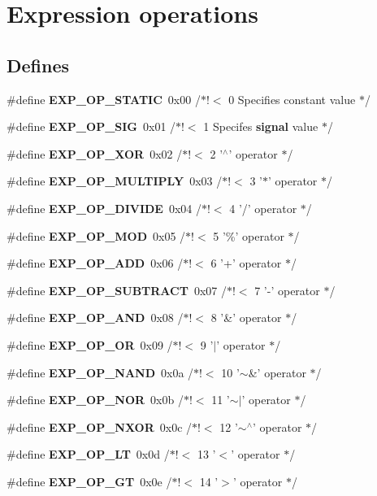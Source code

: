 \section{Expression operations}
\label{group__expr__ops}
\subsection*{Defines}
\begin{CompactItemize}
\item 
\#define {\bf EXP\_\-OP\_\-STATIC}\ 0x00  /$\ast$!$<$  0 Specifies constant value      $\ast$/
\item 
\#define {\bf EXP\_\-OP\_\-SIG}\ 0x01  /$\ast$!$<$  1 Specifes {\bf signal} value         $\ast$/
\item 
\#define {\bf EXP\_\-OP\_\-XOR}\ 0x02  /$\ast$!$<$  2 '$^\wedge$'   operator                $\ast$/
\item 
\#define {\bf EXP\_\-OP\_\-MULTIPLY}\ 0x03  /$\ast$!$<$  3 '$\ast$'   operator                $\ast$/
\item 
\#define {\bf EXP\_\-OP\_\-DIVIDE}\ 0x04  /$\ast$!$<$  4 '/'   operator                $\ast$/
\item 
\#define {\bf EXP\_\-OP\_\-MOD}\ 0x05  /$\ast$!$<$  5 '\%'   operator                $\ast$/
\item 
\#define {\bf EXP\_\-OP\_\-ADD}\ 0x06  /$\ast$!$<$  6 '+'   operator                $\ast$/
\item 
\#define {\bf EXP\_\-OP\_\-SUBTRACT}\ 0x07  /$\ast$!$<$  7 '-'   operator                $\ast$/
\item 
\#define {\bf EXP\_\-OP\_\-AND}\ 0x08  /$\ast$!$<$  8 '\&'   operator                $\ast$/
\item 
\#define {\bf EXP\_\-OP\_\-OR}\ 0x09  /$\ast$!$<$  9 '$|$'   operator                $\ast$/
\item 
\#define {\bf EXP\_\-OP\_\-NAND}\ 0x0a  /$\ast$!$<$ 10 '$\sim$\&'  operator                $\ast$/
\item 
\#define {\bf EXP\_\-OP\_\-NOR}\ 0x0b  /$\ast$!$<$ 11 '$\sim$$|$'  operator                $\ast$/
\item 
\#define {\bf EXP\_\-OP\_\-NXOR}\ 0x0c  /$\ast$!$<$ 12 '$\sim$$^\wedge$'  operator                $\ast$/
\item 
\#define {\bf EXP\_\-OP\_\-LT}\ 0x0d  /$\ast$!$<$ 13 '$<$'   operator                $\ast$/
\item 
\#define {\bf EXP\_\-OP\_\-GT}\ 0x0e  /$\ast$!$<$ 14 '$>$'   operator                $\ast$/

\end{CompactItemize}
